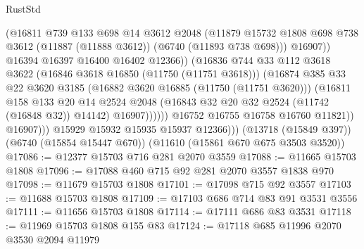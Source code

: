 \begin{lexlean}{RustStd}
\begin{coremodule}
                                (@16811
                                  @739
                                  @133
                                  @698
                                  @14
                                  @3612
                                  @2048
                                  (@11879
                                    @15732
                                    @1808
                                    @698
                                    @738
                                    @3612
                                    (@11887 (@11888 @3612))
                                    (@6740 (@11893 @738 @698)))
                                  @16907))
                              @16394
                              @16397
                              @16400
                              @16402
                              @12366))
                          (@16836
                            @744
                            @33
                            @112
                            @3618
                            @3622
                            (@16846 @3618 @16850 (@11750 (@11751 @3618)))
                            (@16874
                              @385
                              @33
                              @22
                              @3620
                              @3185
                              (@16882 @3620 @16885 (@11750 (@11751 @3620)))
                              (@16811
                                @158
                                @133
                                @20
                                @14
                                @2524
                                @2048
                                (@16843 @32 @20 @32 @2524 (@11742 (@16848 @32)) @14142)
                                @16907))))))
                    @16752
                    @16755
                    @16758
                    @16760
                    @11821))
                @16907)))
          @15929
          @15932
          @15935
          @15937
          @12366)))
    (@13718 (@15849 @397))
    (@6740 (@15854 @15447 @670))
    (@11610 (@15861 @670 @675 @3503 @3520))
@17086 := @12377 @15703 @716 @281 @2070 @3559
@17088 := @11665 @15703 @1808
@17096 := @17088 @460 @715 @92 @281 @2070 @3557 @1838 @970
@17098 := @11679 @15703 @1808
@17101 := @17098 @715 @92 @3557
@17103 := @11688 @15703 @1808
@17109 := @17103 @686 @714 @83 @91 @3531 @3556
@17111 := @11656 @15703 @1808
@17114 := @17111 @686 @83 @3531
@17118 := @11969 @15703 @1808 @155 @83
@17124 := @17118 @685 @11996 @2070 @3530 @2094 @11979

\end{coremodule}
\end{lexlean}
